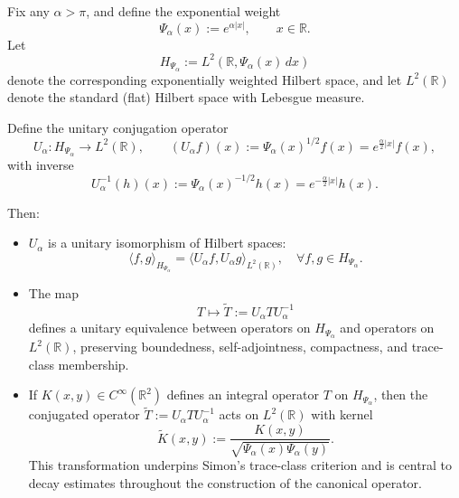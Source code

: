 \begin{definition}
\label{def:unitary_conjugation_operator}
Fix any \( \alpha > \pi \), and define the exponential weight
\[
\Psi_\alpha(x) := e^{\alpha |x|}, \qquad x \in \mathbb{R}.
\]
Let
\[
H_{\Psi_\alpha} := L^2(\mathbb{R}, \Psi_\alpha(x)\, dx)
\]
denote the corresponding exponentially weighted Hilbert space, and let \( L^2(\mathbb{R}) \) denote the standard (flat) Hilbert space with Lebesgue measure.

Define the unitary conjugation operator
\[
U_\alpha \colon H_{\Psi_\alpha} \to L^2(\mathbb{R}), \qquad (U_\alpha f)(x) := \Psi_\alpha(x)^{1/2} f(x) = e^{\frac{\alpha}{2}|x|} f(x),
\]
with inverse
\[
U_\alpha^{-1}(h)(x) := \Psi_\alpha(x)^{-1/2} h(x) = e^{-\frac{\alpha}{2}|x|} h(x).
\]

Then:
\begin{itemize}
    \item \( U_\alpha \) is a unitary isomorphism of Hilbert spaces:
    \[
    \langle f, g \rangle_{H_{\Psi_\alpha}} = \langle U_\alpha f, U_\alpha g \rangle_{L^2(\mathbb{R})}, \quad \forall f, g \in H_{\Psi_\alpha}.
    \]

    \item The map
    \[
    T \mapsto \widetilde{T} := U_\alpha T U_\alpha^{-1}
    \]
    defines a unitary equivalence between operators on \( H_{\Psi_\alpha} \) and operators on \( L^2(\mathbb{R}) \), preserving boundedness, self-adjointness, compactness, and trace-class membership.

    \item If \( K(x,y) \in C^\infty(\mathbb{R}^2) \) defines an integral operator \( T \) on \( H_{\Psi_\alpha} \), then the conjugated operator \( \widetilde{T} := U_\alpha T U_\alpha^{-1} \) acts on \( L^2(\mathbb{R}) \) with kernel
    \[
    \widetilde{K}(x,y) := \frac{K(x,y)}{\sqrt{\Psi_\alpha(x)\Psi_\alpha(y)}}.
    \]
    This transformation underpins Simon’s trace-class criterion and is central to decay estimates throughout the construction of the canonical operator.
\end{itemize}
\end{definition}
